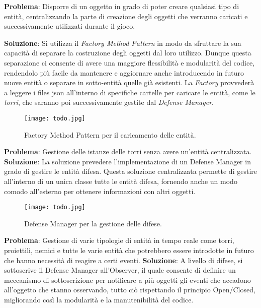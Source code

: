 \documentclass[a4paper,12pt]{report}
\begin{document}
\vspace{15mm}

\textbf{Problema}:
Disporre di un oggetto in grado di poter creare qualsiasi tipo di entità, centralizzando la parte di creazione degli oggetti che verranno caricati e successivamente utilizzati durante il gioco.

\textbf{Soluzione}:
Si utilizza il \textit{Factory Method Pattern} in modo da sfruttare la sua capacità di separare la costruzione degli oggetti dal loro utilizzo. Dunque questa separazione ci consente di avere una maggiore flessibilità e modularità del codice, rendendolo più facile da mantenere e aggiornare anche introducendo in futuro nuove entità o separare in sotto-entità quelle già esistenti. 
La \textit{Factory} provvederà a leggere i files json all'interno di specifiche cartelle per caricare
le entità, come le \textit{torri}, che saranno poi successivamente gestite dal \textit{Defense Manager}.
\begin{figure}[H]
    \centering
    \texttt{[image: todo.jpg]}
    \caption{Factory Method Pattern per il caricamento delle entità.}
    \label{fig:entity-factory-method}
\end{figure}
\vspace{25mm}

\textbf{Problema}:
Gestione delle istanze delle torri senza avere un'entità centralizzata.
\textbf{Soluzione}:
La soluzione prevedere l'implementazione di un Defense Manager in grado di gestire le entità difesa. Questa soluzione centralizzata permette di gestire all'interno di un unica classe tutte le entità difesa, fornendo anche un modo comodo all'esterno per ottenere informazioni con altri oggetti.

\begin{figure}[H]
    \centering
    \texttt{[image: todo.jpg]}
    \caption{Defense Manager per la gestione delle difese.}
    \label{fig:defense-manager}
\end{figure}

\vspace{50mm}
\textbf{Problema}:
Gestione di varie tipologie di entità in tempo reale come torri, proiettili, nemici e tutte le varie entità che potrebbero essere introdotte in futuro che hanno necessità di reagire a certi eventi.
\textbf{Soluzione}:
A livello di difese, si sottoscrive il Defense Manager all'Observer, il quale consente di definire un meccanismo di sottoscrizione per notificare a più oggetti gli eventi che accadono all'oggetto che stanno osservando, tutto ciò rispettando il principio Open/Closed, migliorando così la modularità e la manutenibilità del codice.
\end{document}
